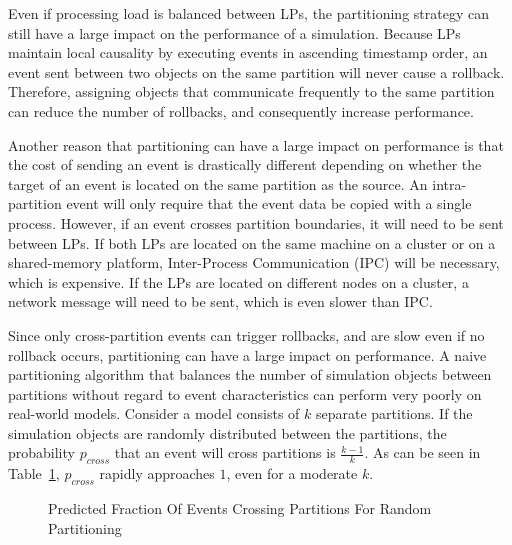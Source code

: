 \documentclass[11pt]{book}
\begin{document}
Even if processing load is balanced between LPs, the partitioning strategy can still have a large impact on the performance of a simulation. Because LPs maintain local causality by executing events in ascending timestamp order, an event sent between two objects on the same partition will never cause a rollback. Therefore, assigning objects that communicate frequently to the same partition can reduce the number of rollbacks, and consequently increase performance.

Another reason that partitioning can have a large impact on performance is that the cost of sending an event is drastically different depending on whether the target of an event is located on the same partition as the source. An intra-partition event will only require that the event data be copied with a single process. However, if an event crosses partition boundaries, it will need to be sent between LPs. If both LPs are located on the same machine on a cluster or on a shared-memory platform, Inter-Process Communication (IPC) will be necessary, which is expensive. If the LPs are located on different nodes on a cluster, a network message will need to be sent, which is even slower than IPC. 

Since only cross-partition events can trigger rollbacks, and are slow even if no rollback occurs, partitioning can have a large impact on performance. A naive partitioning algorithm that balances the number of simulation objects between partitions without regard to event characteristics can perform very poorly on real-world models. Consider a model consists of \(k\) separate partitions. If the simulation objects are randomly distributed between the partitions, the probability \(p_{cross}\) that an event will cross partitions is \(\frac{k-1}{k}\). As can be seen in Table~\ref{fig:predictedEventCrossings}, \(p_{cross}\) rapidly approaches \(1\), even for a moderate \(k\).

\begin{figure}[h]\label{fig:predictedEventCrossings}
\centering
{}
\caption {Predicted Fraction Of Events Crossing Partitions For Random Partitioning}
\end{figure}
\end{document}
